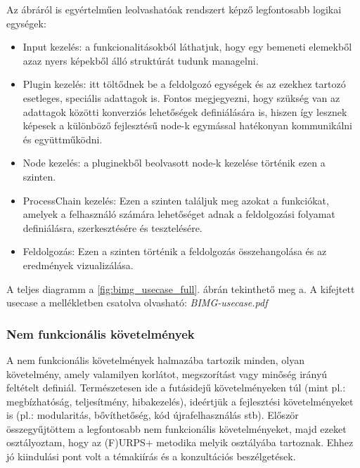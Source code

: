 \documentclass[a4paper,12pt,oneside]{report}
\begin{document}
Az ábráról is egyértelműen leolvashatóak rendszert képző legfontosabb logikai egységek:
\begin{itemize}
	\itemsep0em
	\item Input kezelés: a funkcionalitásokból láthatjuk, hogy egy bemeneti elemekből azaz nyers képekből álló struktúrát tudunk managelni.
	\item Plugin kezelés: itt töltődnek be a feldolgozó egységek és az ezekhez tartozó esetleges, speciális adattagok is. Fontos megjegyezni, hogy szükség van az adattagok közötti konverziós lehetőségek definiálására is, hiszen így lesznek képesek a különböző fejlesztésű node-k egymással hatékonyan kommunikálni és együttműködni.
	\item Node kezelés: a pluginekből beolvasott node-k kezelése történik ezen a szinten.
	\item ProcessChain kezelés: Ezen a szinten találjuk meg azokat a funkciókat, amelyek a felhasználó számára lehetőséget adnak a feldolgozási folyamat definiálásra, szerkesztésére és tesztelésére.
	\item Feldolgozás: Ezen a szinten történik a feldolgozás összehangolása és az eredmények vizualizálása.
\end{itemize}
A teljes diagramm a \ref{fig:bimg_usecase_full}. ábrán tekinthető meg a. A kifejtett usecase a mellékletben csatolva olvasható: \emph{BIMG-usecase.pdf}



\subsubsection{Nem funkcionális követelmények}
A nem funkcionális követelmények halmazába tartozik minden, olyan követelmény, amely valamilyen korlátot, megszorítást vagy minőség irányú feltételt definiál. \cite{publication:soft_nonfunc_req} Természetesen ide a futásidejű követelményeken túl (mint pl.: megbízhatóság, teljesítmény, hibakezelés), ideértjük a fejlesztési követelményeket is (pl.: modularitás, bővíthetőség, kód újrafelhasználás stb). Először összegyűjtöttem a legfontosabb nem funkcionális követelményeket, majd ezeket osztályoztam, hogy az (F)URPS+ metodika melyik osztályába tartoznak. Ehhez jó kiindulási pont volt a témakiírás és a konzultációs beszélgetések.
\end{document}
